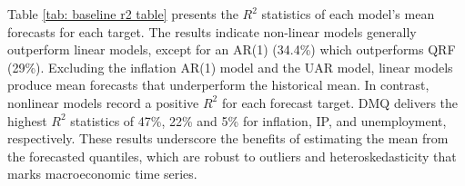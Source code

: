\documentclass[12pt]{article}
\newcommand{\resultsdate}{2026-02-05}
\begin{document}
\begin{table}[htbp]
  \centering
  \resizebox{\textwidth}{!}{
  
  }
  \caption{$R^1$ table for annual inflation, annual IP growth, and annual percent change in the unemployment rate for the period January 1998 to December 2024}
  \label{tab: baseline r1 table}
\end{table}


\begin{table}[htbp]
  \centering
  \caption{Pairwise DM $t$-statistics pooled across quantiles (upper triangular). Significant values at 5\% are in bold.}
  \label{tab: dm_qpooled}

  \begin{subtable}{\textwidth}
    \centering
    \caption*{Panel A: INFL}
    \resizebox{\textwidth}{!}{
    
    }
  \end{subtable}

  \vspace{0.75em}
  \begin{subtable}{\textwidth}
    \centering
    \caption*{Panel B: IP}
    \resizebox{\textwidth}{!}{
    
    }
  \end{subtable}

  \vspace{0.75em}
  \begin{subtable}{\textwidth}
    \centering
    \caption*{Panel C: UNRATE}
    \resizebox{\textwidth}{!}{
    
    }
  \end{subtable}
\end{table}

Table \ref{tab: baseline r2 table} presents the $R^2$ statistics of each model's mean forecasts for each target. The results indicate non-linear models generally outperform linear models, except for an AR(1) (34.4\%) which outperforms QRF (29\%). Excluding the inflation AR(1) model and the UAR model, linear models produce mean forecasts that underperform the historical mean. In contrast, nonlinear models record a positive $R^2$ for each forecast target. DMQ delivers the highest $R^2$ statistics of 47\%, 22\% and 5\% for inflation, IP, and unemployment, respectively. These results underscore the benefits of estimating the mean from the forecasted quantiles, which are robust to outliers and heteroskedasticity that marks macroeconomic time series. 
\end{document}
